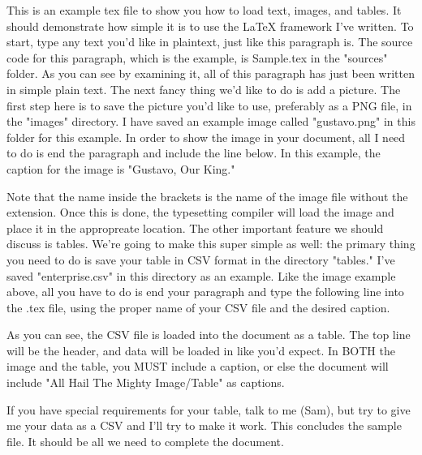 This is an example tex file to show you how to load text, images, and tables. It should demonstrate how simple it is to use the LaTeX framework I've written. To start, type any text you'd like in plaintext, just like this paragraph is. The source code for this paragraph, which is the example, is Sample.tex in the "sources" folder. As you can see by examining it, all of this paragraph has just been written in simple plain text. The next fancy thing we'd like to do is add a picture. The first step here is to save the picture you'd like to use, preferably as a PNG file, in the "images" directory. I have saved an example image called "gustavo.png" in this folder for this example. In order to show the image in your document, all I need to do is end the paragraph and include the line below. In this example, the caption for the image is "Gustavo, Our King."


Note that the name inside the brackets is the name of the image file without the extension. Once this is done, the typesetting compiler will load the image and place it in the appropreate location. The other important feature we should discuss is tables. We're going to make this super simple as well: the primary thing you need to do is save your table in CSV format in the directory "tables." I've saved "enterprise.csv" in this directory as an example. Like the image example above, all you have to do is end your paragraph and type the following line into the .tex file, using the proper name of your CSV file and the desired caption.


As you can see, the CSV file is loaded into the document as a table. The top line will be the header, and data will be loaded in like you'd expect. In BOTH the image and the table, you MUST include a caption, or else the document will include "All Hail The Mighty Image/Table" as captions. 


If you have special requirements for your table, talk to me (Sam), but try to give me your data as a CSV and I'll try to make it work. This concludes the sample file. It should be all we need to complete the document.